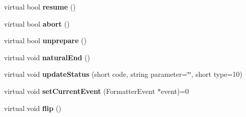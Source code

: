 \begin{CompactItemize}
\item 
virtual bool \textbf{resume} ()\label{classbr_1_1pucrio_1_1telemidia_1_1ginga_1_1ncl_1_1adapters_1_1application_1_1ApplicationPlayerAdapter_0c7b890cc1963471052f4d51db565f8a}

\item 
virtual bool \textbf{abort} ()\label{classbr_1_1pucrio_1_1telemidia_1_1ginga_1_1ncl_1_1adapters_1_1application_1_1ApplicationPlayerAdapter_fd9013d2c3c1e4507a6ba5bb5cdac9f6}

\item 
virtual bool \textbf{unprepare} ()\label{classbr_1_1pucrio_1_1telemidia_1_1ginga_1_1ncl_1_1adapters_1_1application_1_1ApplicationPlayerAdapter_e7bf99c1347e02aa34a54ed2e1d00865}

\item 
virtual void \textbf{naturalEnd} ()\label{classbr_1_1pucrio_1_1telemidia_1_1ginga_1_1ncl_1_1adapters_1_1application_1_1ApplicationPlayerAdapter_0e08b713f0740e1881952f0cc8c307fe}

\item 
virtual void \textbf{updateStatus} (short code, string parameter=\char`\"{}\char`\"{}, short type=10)\label{classbr_1_1pucrio_1_1telemidia_1_1ginga_1_1ncl_1_1adapters_1_1application_1_1ApplicationPlayerAdapter_c03f218bb250bf9c4176bd75a5fee484}

\item 
virtual void \textbf{setCurrentEvent} (FormatterEvent $\ast$event)=0\label{classbr_1_1pucrio_1_1telemidia_1_1ginga_1_1ncl_1_1adapters_1_1application_1_1ApplicationPlayerAdapter_9792359635112024365e4d17ff7ae5a0}

\item 
virtual void {\bf flip} ()\label{classbr_1_1pucrio_1_1telemidia_1_1ginga_1_1ncl_1_1adapters_1_1application_1_1ApplicationPlayerAdapter_c72f57586f07b19e412cc260d54c715b}

\end{CompactItemize}
